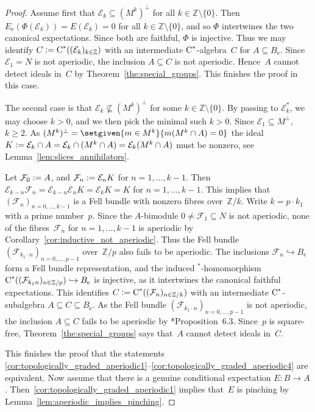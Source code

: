 \documentclass[a4paper]{amsart}
\theoremstyle{plain}
\theoremstyle{definition}
\theoremstyle{remark}
\numberwithin{theorem}{section}
\numberwithin{equation}{section}
\newcommand*{\nb}{\nobreakdash}
\newcommand*{\Star}{\(^*\)\nobreakdash-}
\newcommand*{\Z}{\mathbb Z}
\newcommand*{\ess}{\mathrm{e}}%
\newcommand*{\Cst}{\textup C^*}%
\newcommand*{\Hilm}[1][E]{\mathcal #1}%
\newcommand*{\defeq}{\mathrel{\vcentcolon=}}%
\begin{document}
\begin{proof}
  Assume first that \(\Hilm_k\subseteq (M^k)^\bot\) for all \(k\in \Z\setminus \{0\}\).
  Then~\(E_\ess(\Phi(\Hilm_k))=E(\Hilm_k)=0\)  for all \(k\in \Z\setminus \{0\}\), and so \(\Phi\) intertwines the two canonical expectations.
  Since both are faithful, \(\Phi\) is injective.
  Thus we may identify  \(C\defeq \Cst((\Hilm_k)_{k\in \Z})\)
  with an intermediate \(\Cst\)\nb-algebra~\(C\) for \(A\subseteq
  B_\ess\).
  Since \(\Hilm_1=N\) is not aperiodic, the inclusion \(A\subseteq C\)
  is not aperiodic.
  Hence~\(A\) cannot detect ideals in~\(C\) by Theorem~\ref{the:special_groups}.
  This finishes the proof in this case.

  The second case is that \(\Hilm_k\not\subseteq (M^k)^\bot\) for some
  \(k\in \Z\setminus \{0\}\).
  By passing to \(\Hilm_k^*\), we may choose \(k>0\), and we
  then pick the minimal such \(k>0\).
  Since \(\Hilm_1\subseteq M^\bot\),  \(k\ge 2\).
  As \((M^k)^\bot= \setgiven{m\in M^k}{m(M^k\cap A)=0}\) the
  ideal  \(K\defeq \Hilm_k\cap A=\Hilm_k\cap (M^k\cap A)
  =\Hilm_k (M^k\cap A)\) must be nonzero, see
  Lemma~\ref{lem:slices_annihilators}.
        
  Let \(\Hilm[F]_0 \defeq A\), and
   \(\Hilm[F]_n \defeq \Hilm_nK\) for \(n=1,\dotsc,k-1\).
  Then \(\Hilm_{k-n} \Hilm[F]_n=\Hilm_{k-n}\Hilm_n K=\Hilm_k K= K\) for \(n=1,\dotsc,k-1\).
	This implies that
	\((\Hilm[F]_n)_{n=0,\dotsc,k-1}\) is a Fell bundle
  with nonzero fibres over~\(\Z/k\).
   Write  \(k=p\cdot k_1\) with a prime number~\(p\).
  Since the \(A\)\nb-bimodule \(0\neq\Hilm[F]_1\subseteq N\) is not
  aperiodic, none of the fibres~\(\Hilm[F]_n\) for \(n=1,\dotsc,k-1\)
  is aperiodic by Corollary~\ref{cor:inductive_not_aperiodic}.
  Thus the Fell bundle \((\Hilm[F]_{k_1\cdot
    n})_{n=0,\dotsc,p-1}\) over~\(\Z/p\) also fails to be aperiodic.
  The inclusions \(\Hilm[F]_n \hookrightarrow B_\ess\) form a Fell
  bundle representation, and the induced \Star{}homomorphism
  \(\Cst((\Hilm[F]_{k_1n})_{n\in \Z/p}) \hookrightarrow B_\ess \) is injective,
  as it intertwines the canonical faithful expectations.
  This identifies \(C\defeq\Cst((\Hilm[F]_n)_{n\in \Z/k})\) with an
  intermediate \(\Cst\)\nb-subalgebra \(A\subseteq C\subseteq B_\ess\).
  As the Fell bundle \((\Hilm[F]_{k_1\cdot n})_{n=0,\dotsc,p-1}\) is not aperiodic,
  the inclusion \(A\subseteq C\) fails to be aperiodic by
  \cite{Kwasniewski-Meyer:Essential}*{Proposition~6.3}.
  Since~\(p\) is square-free, Theorem~\ref{the:special_groups} says
  that~\(A\) cannot detect ideals in~\(C\).

  This finishes the proof that the statements
  \ref{cor:topologically_graded_aperiodic1}--\ref{cor:topologically_graded_aperiodic4}
  are equivalent.
  Now assume that there is a genuine conditional expectation \(E\colon
  B\to A\).
  Then~\ref{cor:topologically_graded_aperiodic1} implies that~\(E\) is
  pinching by Lemma~\ref{lem:aperiodic_implies_pinching}.
\end{proof}
\end{document}
